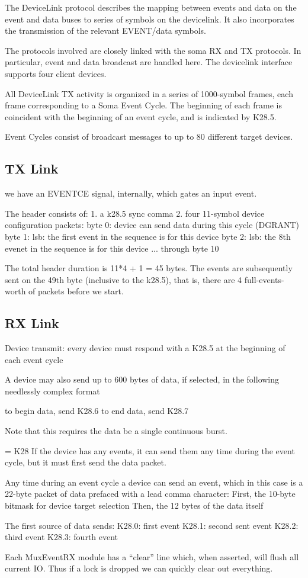 
The DeviceLink protocol describes the mapping between events and
data on the event and data buses to series of symbols on the
devicelink. It also incorporates the transmission of the relevant
EVENT/data symbols.

The protocols involved are closely linked with the soma RX and TX
protocols. In particular, event and data broadcast are handled
here. The devicelink interface supports four client devices.

All DeviceLink TX activity is organized in a series of 1000-symbol
frames, each frame corresponding to a Soma Event Cycle. The beginning
of each frame is coincident with the beginning of an event cycle, and
is indicated by K28.5.

Event Cycles consist of broadcast messages to up to 80 different
target devices. 


\subsection{TX Link} 

we have an EVENTCE signal, internally, which gates an input event. 

The header consists of:
1. a k28.5 sync comma
2. four 11-symbol device configuration packets:
byte 0: device can send data during this cycle (DGRANT)
byte 1: lsb: the first event in the sequence is for this device
byte 2: lsb: the 8th evenet in the sequence is for this device
... through byte 10

The total header duration is 11*4 + 1 = 45 bytes. The events are
subsequently sent on the 49th byte (inclusive to the k28.5), that
is, there are 4 full-events-worth of packets before we start. 



\subsection{RX Link}

Device transmit:
every device must respond with a K28.5 at the beginning of each event cycle

A device may also send up to 600 bytes of data, if selected, in the following needlessly complex format

to begin data, send K28.6
to end data, send K28.7

Note that this requires the data be a single continuous burst. 

= K28
If the device has any events, it can send them any time during the event cycle, but it must first send the data packet. 

Any time during an event cycle a device can send an event, which in
this case is a 22-byte packet of data prefaced with a lead comma
character:
  First, the 10-byte bitmask for device target selection
  Then, the 12 bytes of the data itself

The first source of data sends: 
K28.0: first event
K28.1: second sent event
K28.2: third event
K28.3: fourth event

Each MuxEventRX module has a ``clear'' line which, when asserted, will
flush all current IO. Thus if a lock is dropped we can quickly clear
out everything.
